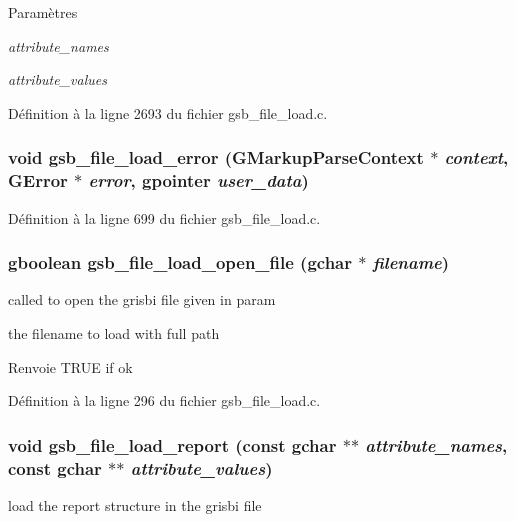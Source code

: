 \begin{DoxyParams}{Paramètres}
\item[{\em attribute\_\-names}]\item[{\em attribute\_\-values}]\end{DoxyParams}


Définition à la ligne 2693 du fichier gsb\_\-file\_\-load.c.

\subsubsection[{gsb\_\-file\_\-load\_\-error}]{\setlength{\rightskip}{0pt plus 5cm}void gsb\_\-file\_\-load\_\-error (GMarkupParseContext $\ast$ {\em context}, \/  GError $\ast$ {\em error}, \/  gpointer {\em user\_\-data})}\label{gsb__file__load_8h_a50bcb5608cad0e40b872e97cbc3ceba6}


Définition à la ligne 699 du fichier gsb\_\-file\_\-load.c.

\subsubsection[{gsb\_\-file\_\-load\_\-open\_\-file}]{\setlength{\rightskip}{0pt plus 5cm}gboolean gsb\_\-file\_\-load\_\-open\_\-file (gchar $\ast$ {\em filename})}\label{gsb__file__load_8h_a0e2c06ff7d8e1a4a4e164e21c03049a0}
called to open the grisbi file given in param

the filename to load with full path

\begin{DoxyReturn}{Renvoie}
TRUE if ok 
\end{DoxyReturn}


Définition à la ligne 296 du fichier gsb\_\-file\_\-load.c.

\subsubsection[{gsb\_\-file\_\-load\_\-report}]{\setlength{\rightskip}{0pt plus 5cm}void gsb\_\-file\_\-load\_\-report (const gchar $\ast$$\ast$ {\em attribute\_\-names}, \/  const gchar $\ast$$\ast$ {\em attribute\_\-values})}\label{gsb__file__load_8h_ab1cecde7461c3a46a43f28d70e79db92}
load the report structure in the grisbi file


